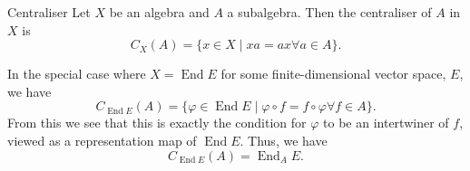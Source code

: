 \documentclass[fleqn]{NotesClass}
\DeclareMathOperator{\End}{End}
\begin{document}
    \begin{dfn}{Centraliser}{}
        Let \(X\) be an algebra and \(A\) a subalgebra.
        Then the centraliser of \(A\) in \(X\) is
        \begin{equation}
            C_X(A) = \{x \in X \mid xa = ax \forall a \in A\}.
        \end{equation}
    \end{dfn}
    
    In the special case where \(X = \End E\) for some finite-dimensional vector space, \(E\), we have
    \begin{equation}
        C_{\End E}(A) = \{\varphi \in \End E \mid \varphi \circ f = f \circ \varphi \forall f \in A\}.
    \end{equation}
    From this we see that this is exactly the condition for \(\varphi\) to be an intertwiner of \(f\), viewed as a representation map of \(\End E\).
    Thus, we have
    \begin{equation}
        C_{\End E}(A) = \End_A E.
    \end{equation}
    
\end{document}
